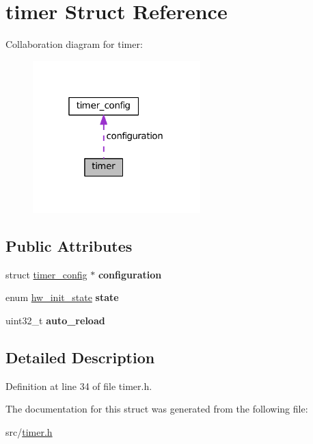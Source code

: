 \hypertarget{structtimer}{}\section{timer Struct Reference}
\label{structtimer}


Collaboration diagram for timer\+:\nopagebreak
\begin{figure}[H]
\begin{center}
\leavevmode
\includegraphics[width=184pt]{structtimer__coll__graph}
\end{center}
\end{figure}
\subsection*{Public Attributes}
\begin{DoxyCompactItemize}
\item 
\hypertarget{structtimer_a2bef740a83dc4af81d0dd6ef45dfbbfd}{}struct \hyperlink{structtimer__config}{timer\+\_\+config} $\ast$ {\bfseries configuration}\label{structtimer_a2bef740a83dc4af81d0dd6ef45dfbbfd}

\item 
\hypertarget{structtimer_a98106a5170cdde683d8bafc2a07ee7cd}{}enum \hyperlink{hw_8h_a3c02952100e7d051b77cdf060ca0ba9b}{hw\+\_\+init\+\_\+state} {\bfseries state}\label{structtimer_a98106a5170cdde683d8bafc2a07ee7cd}

\item 
\hypertarget{structtimer_a879d6cbfcde8edfebb1456b7b4bee2bb}{}uint32\+\_\+t {\bfseries auto\+\_\+reload}\label{structtimer_a879d6cbfcde8edfebb1456b7b4bee2bb}

\end{DoxyCompactItemize}


\subsection{Detailed Description}


Definition at line 34 of file timer.\+h.



The documentation for this struct was generated from the following file\+:\begin{DoxyCompactItemize}
\item 
src/\hyperlink{timer_8h}{timer.\+h}\end{DoxyCompactItemize}
